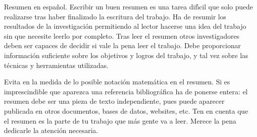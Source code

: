 \abs
\vspace*{-1.5cm}

\begin{resumen}
Resumen en espa\~nol. Escribir un buen resumen es una tarea dif\'{\i}cil que solo puede
realizarse tras haber finalizado la escritura del trabajo. Ha de resumir los resultados
de la investigaci\'on permitiendo al lector hacerse una idea del trabajo sin que necesite
leerlo por completo. Tras leer el resumen otros investigadores deben ser capaces de
decidir si vale la pena leer el trabajo. Debe proporcionar informaci\'on suficiente
sobre los objetivos y logros del trabajo, y tal vez sobre las t\'ecnicas y herramientas
utilizadas.

Evita en la medida de lo posible notaci\'on matem\'atica en el resumen. Si es
imprescindible que aparezca una referencia bibliogr\'afica ha de ponerse entera:
el resumen debe ser una pieza de texto independiente, pues puede aparecer publicada
en otros documentos, bases de datos, websites, etc. Ten en cuenta que el resumen es la
parte de tu trabajo que m\'as gente va a leer. Merece la pena dedicarle
la atenci\'on necesaria.
\end{resumen}

\vfil

\begin{abstract}
Abstract in English.
A good abstract is
difficult to write and can only be completed after the full dissertation has been
written. It represents a brief summary of the results of the dissertation research. By
summarising the results of the research, it allows other people to get an idea of what
was accomplished without having to read through the whole dissertation. Other
scholars can read an abstract to decide if looking at the full work will be worthwhile.
The abstract should provide sufficient information about the results of the research
that reading the full dissertation is not necessary, although your markers will read the
full dissertation. (\dots)

\end{abstract}

